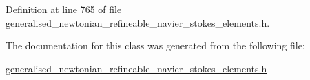 Definition at line 765 of file generalised\+\_\+newtonian\+\_\+refineable\+\_\+navier\+\_\+stokes\+\_\+elements.\+h.



The documentation for this class was generated from the following file\+:\begin{DoxyCompactItemize}
\item 
\hyperlink{generalised__newtonian__refineable__navier__stokes__elements_8h}{generalised\+\_\+newtonian\+\_\+refineable\+\_\+navier\+\_\+stokes\+\_\+elements.\+h}\end{DoxyCompactItemize}
